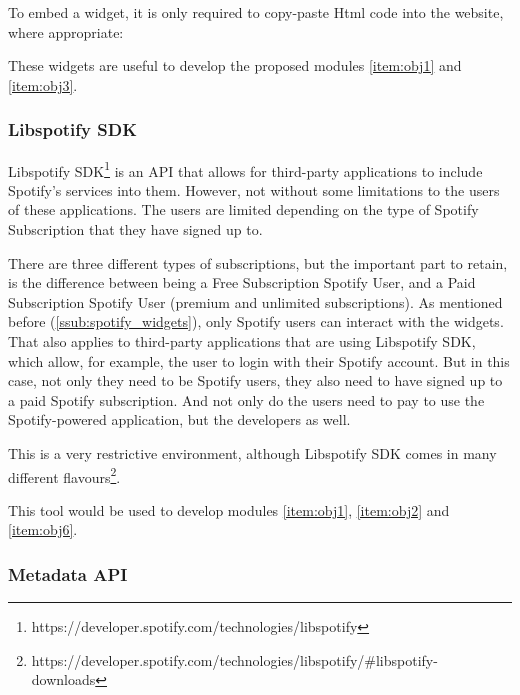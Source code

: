       To embed a widget, it is only required to copy-paste Html code into the website, where appropriate:

      

      These widgets are useful to develop the proposed modules \ref{item:obj1} and \ref{item:obj3}.


    \subsubsection{Libspotify SDK} %
    \label{ssub:libspotify_sdk}

      Libspotify SDK\footnote{https://developer.spotify.com/technologies/libspotify} is an API that allows for third-party applications to include Spotify's services into them.
      However, not without some limitations to the users of these applications.
      The users are limited depending on the type of Spotify Subscription that they have signed up to.

      There are three different types of subscriptions, but the important part to retain, is the difference between being a Free Subscription Spotify User, and a Paid Subscription Spotify User (premium and unlimited subscriptions).
      As mentioned before (\ref{ssub:spotify_widgets}), only Spotify users can interact with the widgets.
      That also applies to third-party applications that are using Libspotify SDK, which allow, for example, the user to login with their Spotify account.
      But in this case, not only they need to be Spotify users, they also need to have signed up to a paid Spotify subscription.
      And not only do the users need to pay to use the Spotify-powered application, but the developers as well.

      This is a very restrictive environment, although Libspotify SDK comes in many different flavours\footnote{https://developer.spotify.com/technologies/libspotify/\#libspotify-downloads}.

      This tool would be used to develop modules \ref{item:obj1}, \ref{item:obj2} and \ref{item:obj6}.
      



    \subsubsection{Metadata API} %
    \label{ssub:metadata_api}

